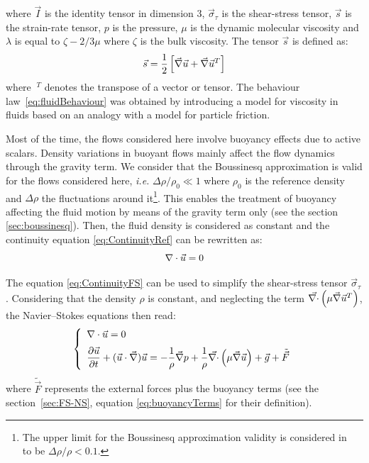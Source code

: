 where $\vec{I}$ is the identity tensor in dimension 3, $\vec{\sigma}_\tau$ is the shear-stress tensor, $\vec{s}$ is the strain-rate tensor,
$p$ is the pressure, $\mu$ is the dynamic molecular viscosity
and $\lambda$ is equal to $\zeta-2/3\mu$ where $\zeta$ is the bulk viscosity.
The tensor $\vec{s}$ is defined as:
\begin{equation}\label{eq:strain-rate}
  \vec{s} = \dfrac{1}{2}\left[\vec \nabla\vec{u} + \vec \nabla\vec{u}^T\right]
\end{equation}
where $~^T$ denotes the transpose of a vector or tensor.
The behaviour law~\eqref{eq:fluidBehaviour} was obtained by introducing a model for viscosity in fluids based on an analogy with a model for particle friction.

Most of the time, the flows considered here involve buoyancy effects due to active scalars.
Density variations in buoyant flows mainly affect the flow dynamics through the gravity term.
We consider that the Boussinesq approximation is valid for the flows considered here, \textit{i.e.} $\Delta \rho/\rho_0 \ll 1$
where $\rho_0$ is the reference density and $\Delta\rho$ the fluctuations around
it\footnote{The upper limit for the Boussinesq approximation validity is considered in~\cite{Viollet1997} to be $\Delta \rho/\rho < 0.1$.}.
This enables the treatment of buoyancy affecting the fluid motion by means of the gravity term only
(see the section \ref{sec:boussinesq}).
Then, the fluid density is considered as constant and the continuity equation \eqref{eq:ContinuityRef} can be rewritten as:
\begin{equation}
  \nabla \cdot \vec{u} = 0
  \label{eq:ContinuityFS}
\end{equation}

The equation \eqref{eq:ContinuityFS} can be used to simplify the shear-stress tensor $\vec{\sigma}_\tau$.
Considering that the density $\rho$ is constant, and neglecting the term $\vec{\nabla \cdot} \left(\mu \vec \nabla \vec{u}^T\right)$,
the Navier--Stokes equations then read:
\begin{equation}\label{eq:NS_buoyant}
  \left\{
    \begin{array}{l}
      \Div \vec{u} = 0 \medskip \\
      \dfrac{\partial \vec{u} }{\partial t} + (\vec{u} \cdot \Grad) \vec{u} = -\dfrac{1}{\rho} \Grad p + \dfrac{1}{\rho} \vec{\Div} \left(\mu \Grad \vec{u}\right)+ \vec{g} + \tilde{\vec{F}}\\
    \end{array}
  \right.
\end{equation}
where $\tilde{\vec{F}}$ represents the external forces plus the buoyancy terms (see the section~\ref{sec:FS-NS},
equation \eqref{eq:buoyancyTerms} for their definition).

